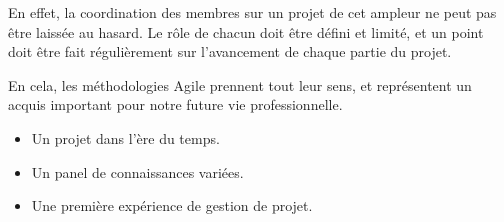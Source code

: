 En effet, la coordination des membres sur un projet de cet ampleur ne peut pas être laissée au hasard. Le rôle de chacun doit être défini et limité, et un point doit être fait régulièrement sur l'avancement de chaque partie du projet.

En cela, les méthodologies Agile prennent tout leur sens, et représentent un acquis important pour notre future vie professionnelle.
\begin{itemize}
\item Un projet dans l'ère du temps.
\item Un panel de connaissances variées.
\item Une première expérience de gestion de projet.
\end{itemize}
